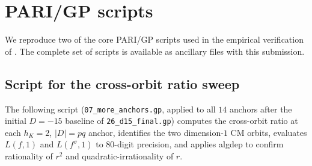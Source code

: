 \documentclass[11pt]{amsart}
\theoremstyle{definition}
\theoremstyle{remark}
\begin{document}
\appendix


\section{PARI/GP scripts}\label{app:scripts}

We reproduce two of the core PARI/GP scripts used in the empirical
verification of . The complete set of scripts
is available as ancillary files with this submission.

\subsection{Script for the cross-orbit ratio sweep}

The following script (\verb|07_more_anchors.gp|, applied to all
\(14\) anchors after the initial \(D = -15\) baseline of
\verb|26_d15_final.gp|) computes the cross-orbit ratio at each
\(h_{K} = 2\), \(|D| = pq\) anchor, identifies the two
dimension-\(1\) CM orbits, evaluates
\(L(f, 1)\) and \(L(f^{\sigma}, 1)\) to \(80\)-digit precision,
and applies \textsf{algdep} to confirm rationality of \(r^{2}\)
and quadratic-irrationality of \(r\).
\end{document}
